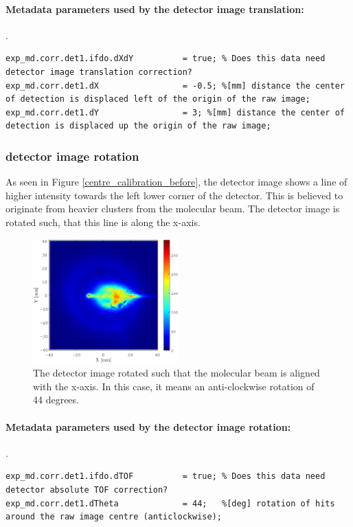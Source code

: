 \paragraph{Metadata parameters used by the detector image translation:}
.\newline
\lstset{language=MATLAB}
\begin{lstlisting}
exp_md.corr.det1.ifdo.dXdY 			= true; % Does this data need detector image translation correction?
exp_md.corr.det1.dX					= -0.5; %[mm] distance the center of detection is displaced left of the origin of the raw image; 
exp_md.corr.det1.dY					= 3; %[mm] distance the center of detection is displaced up the origin of the raw image;
\end{lstlisting}

\subsubsection{detector image rotation}
As seen in Figure \ref{centre_calibration_before}, the detector image shows a line of higher intensity towards the left lower corner of the detector. This is believed to originate from heavier clusters from the molecular beam. The detector image is rotated such, that this line is along the x-axis. 

\begin{figure}[h]
   \centering
    \centerline{\includegraphics[width=0.5\textwidth]{Graphics/rotation_after.eps}}
\caption{The detector image rotated such that the molecular beam is aligned with the x-axis. In this case, it means an anti-clockwise rotation of 44 degrees.}
\label{Data_structure_schematic}
\end{figure}

\paragraph{Metadata parameters used by the detector image rotation:}
.\newline
\lstset{language=MATLAB}
\begin{lstlisting}
exp_md.corr.det1.ifdo.dTOF  		= true; % Does this data need detector absolute TOF correction?
exp_md.corr.det1.dTheta				= 44;   %[deg] rotation of hits around the raw image centre (anticlockwise);
\end{lstlisting}

